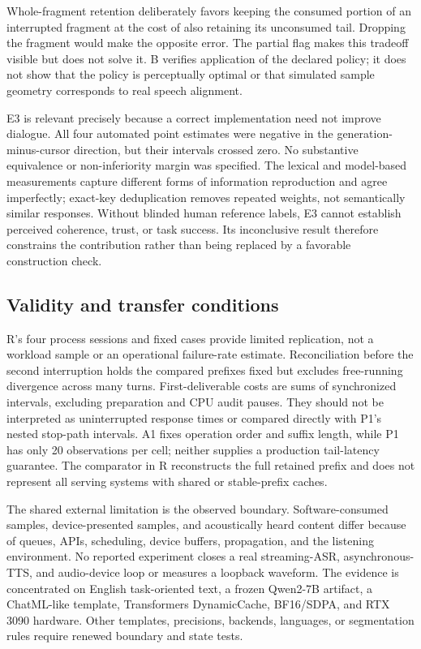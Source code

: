 Whole-fragment retention deliberately favors keeping the consumed portion of an interrupted fragment at the cost of also retaining its unconsumed tail. Dropping the fragment would make the opposite error. The partial flag makes this tradeoff visible but does not solve it. B verifies application of the declared policy; it does not show that the policy is perceptually optimal or that simulated sample geometry corresponds to real speech alignment.

E3 is relevant precisely because a correct implementation need not improve dialogue. All four automated point estimates were negative in the generation-minus-cursor direction, but their intervals crossed zero. No substantive equivalence or non-inferiority margin was specified. The lexical and model-based measurements capture different forms of information reproduction and agree imperfectly; exact-key deduplication removes repeated weights, not semantically similar responses. Without blinded human reference labels, E3 cannot establish perceived coherence, trust, or task success. Its inconclusive result therefore constrains the contribution rather than being replaced by a favorable construction check.

\subsection{Validity and transfer conditions}

R's four process sessions and fixed cases provide limited replication, not a workload sample or an operational failure-rate estimate. Reconciliation before the second interruption holds the compared prefixes fixed but excludes free-running divergence across many turns. First-deliverable costs are sums of synchronized intervals, excluding preparation and CPU audit pauses. They should not be interpreted as uninterrupted response times or compared directly with P1's nested stop-path intervals. A1 fixes operation order and suffix length, while P1 has only 20 observations per cell; neither supplies a production tail-latency guarantee. The comparator in R reconstructs the full retained prefix and does not represent all serving systems with shared or stable-prefix caches.

The shared external limitation is the observed boundary. Software-consumed samples, device-presented samples, and acoustically heard content differ because of queues, APIs, scheduling, device buffers, propagation, and the listening environment. No reported experiment closes a real streaming-ASR, asynchronous-TTS, and audio-device loop or measures a loopback waveform. The evidence is concentrated on English task-oriented text, a frozen Qwen2-7B artifact, a ChatML-like template, Transformers DynamicCache, BF16/SDPA, and RTX 3090 hardware. Other templates, precisions, backends, languages, or segmentation rules require renewed boundary and state tests.


